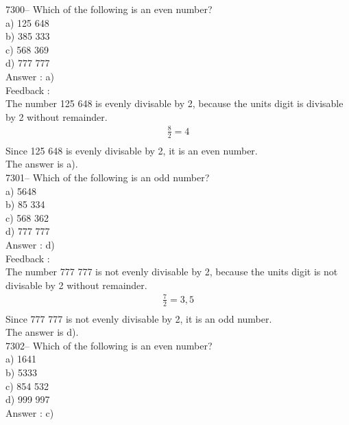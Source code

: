 \documentclass[letterpaper, 12pt]{article}
\begin{document}
7300-- Which of the following is an even number?\\

a) 125 648\\
b) 385 333\\
c) 568 369\\
d) 777 777\\

Answer : a)\\

Feedback :\\
The number 125 648 is evenly divisable by 2, because the 
units digit is divisable by 2 without remainder.\\
\begin{eqnarray*}
\frac{8}{2}=4\\
\end{eqnarray*}
Since 125 648 is evenly divisable by 2, it is an even number.\\
The answer is a).\\



7301-- Which of the following is an odd number?\\

a) 5648\\
b) 85 334\\
c) 568 362\\
d) 777 777\\

Answer : d)\\

Feedback :\\
The number 777 777 is not evenly divisable by 2, because the units 
digit is not divisable by 2 without remainder.\\
\begin{eqnarray*}
\frac{7}{2}=3,5\\
\end{eqnarray*}
Since 777 777 is not evenly divisable by 2, it is an odd number.\\
The answer is d).\\




7302-- Which of the following is an even number?\\

a) 1641\\
b) 5333\\
c) 854 532\\
d) 999 997\\

Answer : c)\\
\end{document}
